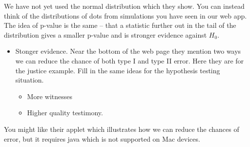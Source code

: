    We have not yet used the normal distribution which they show.  You
   can instead think of the distributions of dots from simulations you
   have seen in our web app. The idea of p-value is the same --
   that a statistic further out in the tail of the distribution gives
   a smaller p-value and is stronger evidence against $H_0$.

   \begin{itemize}
   \item Stonger evidence. Near the bottom of the web page they
     mention two ways we can reduce the chance of both type I and type
     II error. Here they are for the justice example.  Fill in the
     same ideas for the hypothesis testing situation.  
     \begin{itemize}
     \item More witnesses \vspace{1in}
     \item Higher quality testimony. \vspace{1in}
     \end{itemize}
   \end{itemize}
 
 You might like their applet which illustrates how we can reduce the
 chances of error, but it requires java which is not supported on Mac
 devices. 